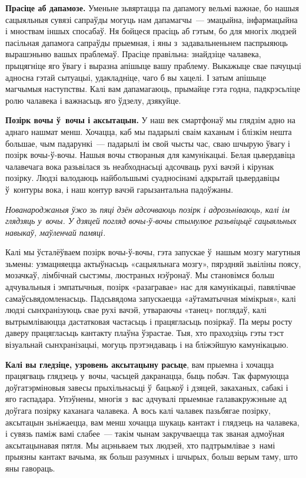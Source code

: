 \textbf{Прасіце аб дапамозе.} Уменьне зьвяртацца па дапамогу вельмі важнае, бо нашыя сацыяльныя сувязі сапраўды могуць нам дапамагчы~--- эмацыйна, інфармацыйна і мноствам іншых спосабаў. Ня бойцеся прасіць аб гэтым, бо для многіх людзей пасільная дапамога сапраўды прыемная, і яны з~задавальненьнем паспрыяюць вырашэньню вашых праблемаў. Прасіце правільна: знайдзіце чалавека, прыцягніце яго ўвагу і выразна апішыце вашу праблему. Выкажыце свае пачуцьці адносна гэтай сытуацыі, удакладніце, чаго б вы хацелі. І затым апішыце магчымыя наступствы. Калі вам дапамагаюць, прымайце гэта годна, падкрэсьліце ролю чалавека і важнасьць яго ўдзелу, дзякуйце.


\textbf{Позірк вочы ў~вочы і аксытацын.} У наш век смартфонаў мы глядзім адно на аднаго нашмат менш. Хочацца, каб мы падарылі сваім каханым і блізкім нешта большае, чым падарункі~--- падарылі ім свой чысты час, сваю шчырую ўвагу і позірк вочы-ў-вочы. Нашыя вочы створаныя для камунікацыі. Белая цьвердавіца чалавечага вока разьвілася зь неабходнасьці адсочваць рухі вачэй і кірунак позірку. Людзі валодаюць найбольшымі суадносінамі адкрытай цьвердавіцы ў~контуры вока, і наш контур вачэй гарызантальна падоўжаны. 

\emph{Нованароджаныя ўжо зь пяці дзён адсочваюць позірк і адрозьніваюць, калі ім глядзяць у~вочы. У дзяцей погляд вочы-ў-вочы стымулюе разьвіцьцё сацыяльных навыкаў, маўленчай памяці.} 

Калі мы ўсталёўваем позірк вочы-ў-вочы, гэта запускае ў~нашым мозгу магутныя зьмены: узмацняецца актыўнасьць «сацыяльнага мозгу», пярэдняй зьвіліны поясу, мозачкаў, лімбічнай сыстэмы, люстраных нэўронаў. Мы становімся больш адчувальныя і эмпатычныя, позірк «разагравае» нас для камунікацыі, павялічвае самаўсьвядомленасьць. Падсьвядома запускаецца «аўтаматычная мімікрыя», калі людзі сынхранізуюць свае рухі вачэй, утвараючы «танец» поглядаў, калі вытрымліваюцца дастатковая частасьць і працягласьць позіркаў. Па меры росту даверу працягласьць кантакту плаўна ўзрастае. Тыя, хто праходзіць гэты тэст візуальнай сынхранізацыі, могуць прэтэндаваць і на бліжэйшую камунікацыю.

\textbf{Калі вы гледзіце, узровень аксытацыну расьце}, вам прыемна і хочацца працягваць глядзець у~вочы, часьцей дакранацца, быць побач. Так фармуюцца доўгатэрміновыя завесы прыхільнасьці ў~бацькоў і дзяцей, закаханых, сабакі і яго гаспадара. Упэўнены, многія з~вас адчувалі прыемнае галавакружэньне ад доўгага позірку каханага чалавека. А вось калі чалавек пазьбягае позірку, аксытацын зьніжаецца, вам менш хочацца шукаць кантакт і глядзець на чалавека, і сувязь паміж вамі слабее~--- такім чынам закручваецца так званая адмоўная аксытацынавая пятля. Мы ацэньваем тых людзей, хто падтрымлівае з~намі прыязны кантакт вачыма, як больш разумных і шчырых, больш верым таму, што яны гавораць.

